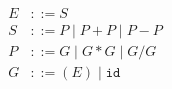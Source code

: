 \begin{align}
  E &::=   S                         \\
  S &::=   P   \mid P + P \mid P - P \\
  P &::=   G   \mid G * G \mid G / G \\
  G &::= ( E ) \mid \texttt{id}
\end{align}
